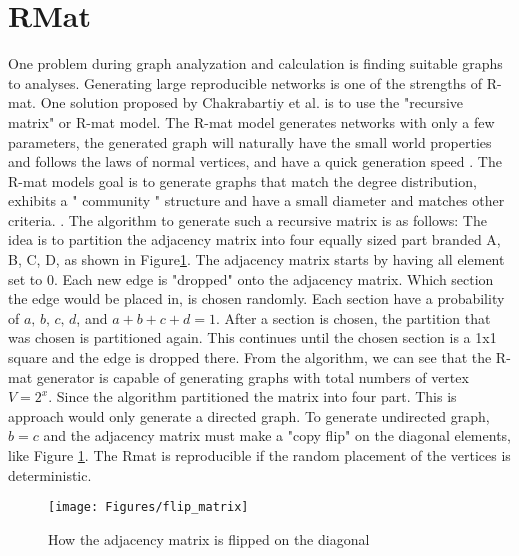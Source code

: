 \section{RMat} \label{rmat}
One problem during graph analyzation and calculation is finding suitable graphs to analyses. Generating large reproducible networks is one of the strengths of R-mat. One solution proposed by Chakrabartiy et al. is to use the "recursive matrix" or R-mat model. The R-mat model generates networks with only a few parameters, the generated graph will naturally have the small world properties and follows the laws of normal vertices, and have a quick generation speed \cite{Rmat2004}. The R-mat models goal is to generate graphs that match the degree distribution, exhibits a " community " structure and have a small diameter and matches other criteria. \cite{Rmat2004}. The algorithm to generate such a recursive matrix is as follows: The idea is to partition the adjacency matrix into four equally sized part branded A, B, C, D, as shown in Figure\ref{fig:flipDiagonal}. The adjacency matrix starts by having all element set to 0. Each new edge is "dropped" onto the adjacency matrix. Which section the edge would be placed in, is chosen randomly. Each section have a probability of $\textit{a, b, c, d}$, and $a + b + c + d = 1$. After a section is chosen, the partition that was chosen is partitioned again. This continues until the chosen section is a 1x1 square and the edge is dropped there. From the algorithm, we can see that the R-mat generator is capable of generating graphs with total numbers of vertex $ \textit{V} = 2^x$. Since the algorithm partitioned the matrix into four part. This is approach would only generate a directed graph. To generate undirected graph, $b = c$ and the adjacency matrix must make a "copy flip" on the diagonal elements, like Figure \ref{fig:flipDiagonal}. The Rmat is reproducible if the random placement of the vertices is deterministic.

\begin{figure}
\texttt{[image: Figures/flip\_matrix]}
\caption{How the adjacency matrix is flipped on the diagonal}
\label{fig:flipDiagonal}
\end{figure}